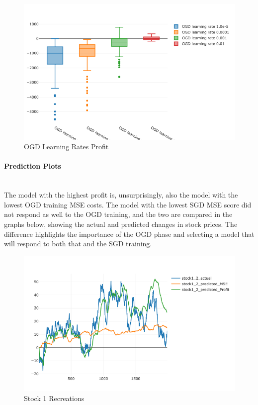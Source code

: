 \documentclass[a4paper,latin]{paper}
\begin{document}
\begin{figure}[H]
	\centering \includegraphics[scale=0.5]{images/synthetic_results/bp_ogd_lr_profit.png}
	\caption{OGD Learning Rates Profit}
	\label{figure-synthetic-ogd-lr-profit}
\end{figure}

\paragraph{Prediction Plots}\mbox{}\\

The model with the highest profit is, unsurprisingly, also the model with the lowest OGD training MSE costs. The model with the lowest SGD MSE score did not respond as well to the OGD training, and the two are compared in the graphs below, showing the actual and predicted changes in stock prices. The difference highlights the importance of the OGD phase and selecting a model that will respond to both that and the SGD training.

\begin{figure}[H]
	\centering \includegraphics[scale=0.5]{images/synthetic_results/recreation_stock1.png}
	\caption{Stock 1 Recreations}
	\label{figure-synthetic-stock1-recreation}
\end{figure}
\end{document}
